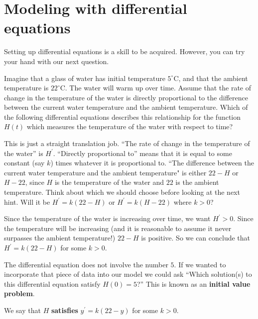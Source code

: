\documentclass{ximera}
\begin{document}
\section{Modeling with differential equations}

Setting up differential equations is a skill to be acquired. However,
you can try your hand with our next question.

\begin{question}
  Imagine that a glass of water has initial temperature $5^\circ
  \mathrm{C}$, and that the ambient temperature is $22^\circ \mathrm{C}$.
  The water will warm up over time.  Assume that the rate of change in
  the temperature of the water is directly proportional to the
  difference between the current water temperature and the ambient
  temperature.  Which of the following differential equations 
  describes this relationship for the function $H(t)$ which measures the temperature of
  the water with respect to time?
  \begin{multipleChoice}
  \end{multipleChoice}
  \begin{hint}
    This is just a straight translation job.  ``The rate of change in
    the temperature of the water'' is $H^{\prime}$.  ``Directly proportional
    to'' means that it is equal to some constant (say $k$) times
    whatever it is proportional to.  ``The difference between the
    current water temperature and the ambient temperature" is either
    $22-H$ or $H-22$, since $H$ is the temperature of the water and
    $22$ is the ambient temperature.  Think about which we should
    choose before looking at the next hint.  Will it be $H^{\prime}=k(22-H)$
    or $H^{\prime}=k(H-22)$ where $k>0$?
  \end{hint}
  \begin{hint}
    Since the temperature of the water is increasing over time, we
    want $H^{\prime}>0$.  Since the temperature will be increasing (and it is
    reasonable to assume it never surpasses the ambient temperature!)
    $22-H$ is positive.  So we can conclude that $H^{\prime} = k(22-H)$ for
    some $k>0$.
  \end{hint}
  
  \begin{feedback}
    The differential equation does not involve the number $5$.  If we
    wanted to incorporate that piece of data into our model we could
    ask ``Which solution(s) to this differential equation satisfy
    $H(0) = 5$?''  This is known as an \textbf{initial value problem}.  %
  \end{feedback}
\end{question}
We say that $H$ \textbf{satisfies}  $y^{\prime} = k(22-y)$ for some $k>0$. \\
\end{document}

